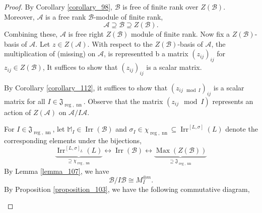 \documentclass[8pt]{article}
\DeclareMathOperator{\Rep}{Rep}
\DeclareMathOperator{\Mod}{Mod}
\DeclareMathOperator{\Irr}{Irr}
\DeclareMathOperator{\nn}{nn}
\DeclareMathOperator{\reg}{reg}
\DeclareMathOperator{\Max}{Max}
\newcommand{\M}[0]{\mathbb{M}}
\newcommand{\cA}{\mathcal{A}}
\newcommand{\cB}{\mathcal{B}}
\newcommand{\tens}[1]{%
  \mathbin{\mathop{\otimes}\displaylimits_{#1}}%
}
\begin{document}
\begin{proof}
  By Corollary \ref{corollary_98}, $\cB$ is free of finite rank over $Z(\cB)$. Moreover, $\cA$ is a free rank $\cB$-module of finite rank,
  \begin{equation*}
    \cA\supseteq\cB\supseteq Z(\cB).
  \end{equation*}
  Combining these, $\cA$ is free right $Z(\cB)$ module of finite rank. Now fix a $Z(\cB)$-basis of $\cA$.
  Let $z\in Z(\cA)$. With respect to the $Z(\cB)$-basis of $\cA$, the multiplication of (missing) on $\cA$, is representted b a matrix $(z_{ij})_{ij}$ for $z_{ij}\in Z(\cB)$, It suffices to show that $(z_{ij})_{ij}$ is a scalar matrix.
  \par By Corollary \ref{corollary_112}, it suffices to show that $(z_{ij \mod I})_{ij}$ is a scalar matrix for all $I\in\mathfrak{J}_{\reg,\nn}$. Observe that the matrix $(z_{ij}\mod I)$ represents an action of $Z(\cA)$ on $\cA/I\cA$.
  \par For $I\in\mathfrak{J}_{\reg,\nn}$, let $\M_I\in\Irr(\cB)$ and $\sigma_I\in\chi_{\reg,\nn}\subseteq \Irr^{[L,\sigma]}(L)$ denote the corresponding elements under the bijections,
  \begin{equation*}
    \underbrace{\Irr^{[L,\sigma]_L}(L)}_{\supseteq \chi_{\reg,\nn}}\leftrightarrow\Irr(\cB)\leftrightarrow\underbrace{\Max(Z(\cB))}_{\supseteq \mathfrak{J}_{\reg,\nn}}
  \end{equation*}
  By Lemma \ref{lemma_107}, we have 
  \begin{equation*}
    \cB/I\cB\cong M_I^{\oplus m}.
  \end{equation*}
  By Proposition \ref{proposition_103}, we have the following commutative diagram,
  \begin{center}
  \end{center}

\end{proof}
\end{document}
